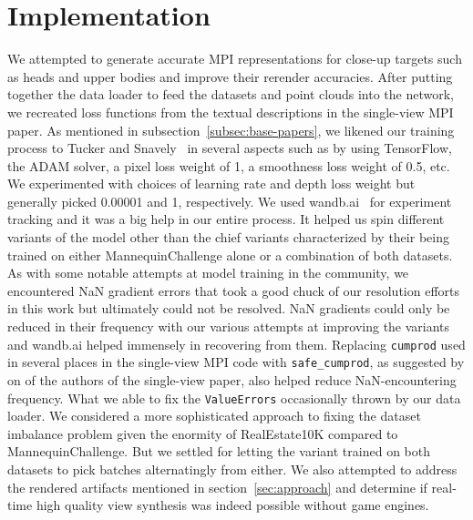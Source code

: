 \section{Implementation}\label{sec:implementation} 

We attempted to generate accurate MPI representations for close-up targets such as heads and upper bodies and improve their rerender accuracies. After putting together the data loader to feed the datasets and point clouds into the network, we recreated loss functions from the textual descriptions in the single-view MPI paper. As mentioned in subsection~\ref{subsec:base-papers}, we likened our training process to Tucker and Snavely~\cite{single_view_mpi} in several aspects such as by using TensorFlow, the ADAM solver, a pixel loss weight of 1, a smoothness loss weight of 0.5, etc. We experimented with choices of learning rate and depth loss weight but generally picked 0.00001 and 1, respectively. We used wandb.ai~\cite{wandb} for experiment tracking and it was a big help in our entire process. It helped us spin different variants of the model other than the chief variants characterized by their being trained on either MannequinChallenge alone or a combination of both datasets. As with some notable attempts at model training in the community, we encountered NaN gradient errors that took a good chuck of our resolution efforts in this work but ultimately could not be resolved. NaN gradients could only be reduced in their frequency with our various attempts at improving the variants and wandb.ai helped immensely in recovering from them. Replacing \texttt{cumprod} used in several places in the single-view MPI code with \texttt{safe\_cumprod}, as suggested by on of the authors of the single-view paper, also helped reduce NaN-encountering frequency. What we able to fix the \texttt{ValueErrors} occasionally thrown by our data loader. We considered a more sophisticated approach to fixing the dataset imbalance problem given the enormity of RealEstate10K compared to MannequinChallenge. But we settled for letting the variant trained on both datasets to pick batches alternatingly from either. We also attempted to address the rendered artifacts mentioned in section~\ref{sec:approach} and determine if real-time high quality view synthesis was indeed possible without game engines.

